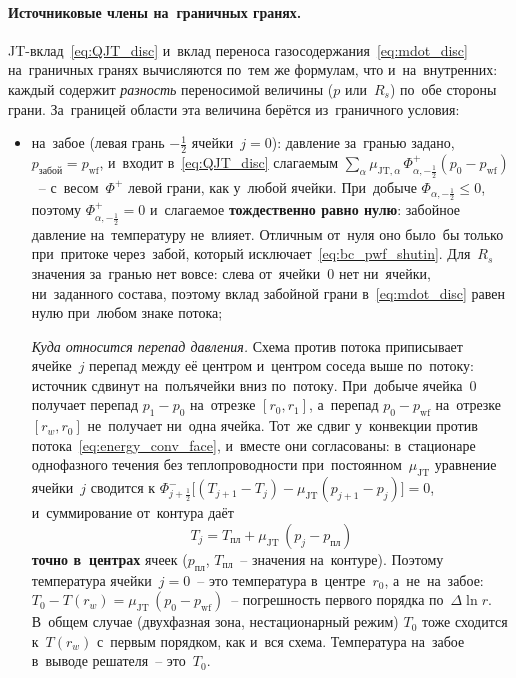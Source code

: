 \documentclass[12pt,a4paper]{article}
\newcommand{\half}{\tfrac{1}{2}}
\newcommand{\rw}{r_w}
\newcommand{\ppl}{p_{\text{пл}}}
\newcommand{\pwf}{p_{\mathrm{wf}}}
\newcommand{\Tpl}{T_{\text{пл}}}
\begin{document}
\paragraph{Источниковые члены на~граничных гранях.}
JT-вклад~\eqref{eq:QJT_disc} и~вклад переноса
газосодержания~\eqref{eq:mdot_disc} на~граничных гранях
вычисляются по~тем же формулам, что и~на~внутренних: каждый содержит
\emph{разность} переносимой величины ($p$ или~$R_s$) по~обе стороны
грани. За~границей области эта величина берётся из~граничного условия:
\begin{itemize}[nosep]
  \item на~забое (левая грань $-\half$ ячейки~$j = 0$):
    давление за~гранью задано, $p_{\text{забой}} = \pwf$, и~входит
    в~\eqref{eq:QJT_disc} слагаемым
    $\sum_\alpha \mu_{\mathrm{JT},\alpha}\,\Phi_{\alpha,-\half}^{+}
    (p_0 - \pwf)$~-- с~весом~$\Phi^{+}$ левой грани, как у~любой
    ячейки. При~добыче $\Phi_{\alpha,-\half} \le 0$, поэтому
    $\Phi^{+}_{\alpha,-\half} = 0$ и~слагаемое \textbf{тождественно
    равно нулю}: забойное давление на~температуру не~влияет. Отличным
    от~нуля оно было~бы только при~притоке через~забой, который
    исключает~\eqref{eq:bc_pwf_shutin}. Для~$R_s$ значения за~гранью
    нет вовсе: слева от~ячейки~0 нет ни~ячейки, ни~заданного состава,
    поэтому вклад забойной грани в~\eqref{eq:mdot_disc} равен нулю
    при~любом знаке потока;

    \emph{Куда относится перепад давления.} Схема против потока
    приписывает ячейке~$j$ перепад между её центром и~центром соседа
    выше по~потоку: источник сдвинут на~полъячейки вниз по~потоку.
    При~добыче ячейка~0 получает перепад $p_1 - p_0$ на~отрезке
    $[r_0, r_1]$, а~перепад $p_0 - \pwf$ на~отрезке $[\rw, r_0]$
    не~получает ни~одна ячейка. Тот~же сдвиг у~конвекции
    против потока~\eqref{eq:energy_conv_face}, и~вместе они
    согласованы: в~стационаре однофазного течения без
    теплопроводности при~постоянном~$\mu_{\mathrm{JT}}$ уравнение
    ячейки~$j$ сводится к
    $\Phi^{-}_{j+\half}\bigl[(T_{j+1} - T_j)
    - \mu_{\mathrm{JT}}(p_{j+1} - p_j)\bigr] = 0$, и~суммирование
    от~контура даёт
    \[
      T_j = \Tpl + \mu_{\mathrm{JT}}\,(p_j - \ppl)
    \]
    \textbf{точно в~центрах} ячеек ($\ppl$, $\Tpl$~--
    значения на~контуре). Поэтому температура ячейки~$j = 0$~--
    это температура в~центре~$r_0$, а~не~на~забое:
    $T_0 - T(\rw) = \mu_{\mathrm{JT}}\,(p_0 - \pwf)$~-- погрешность
    первого порядка по~$\Delta\ln r$. В~общем случае (двухфазная
    зона, нестационарный режим) $T_0$ тоже сходится к~$T(\rw)$
    с~первым порядком, как и~вся схема. Температура на~забое
    в~выводе решателя~-- это~$T_0$.


\end{itemize}
\end{document}
